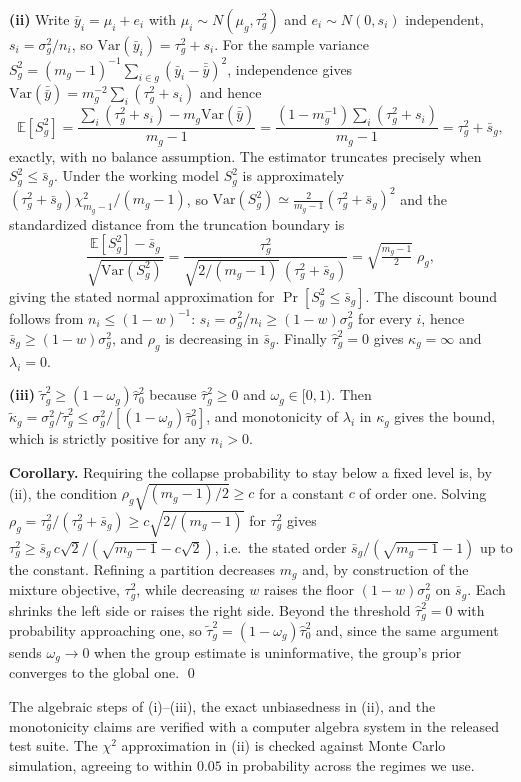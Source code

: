 \documentclass[twocolumn,10pt]{article}
\newcommand{\E}{\mathbb{E}}
\newcommand{\Var}{\mathrm{Var}}
\begin{document}
\textbf{(ii)} Write $\bar y_i=\mu_i+e_i$ with
$\mu_i\sim N(\mu_g,\tau_g^2)$ and $e_i\sim N(0,s_i)$ independent,
$s_i=\sigma_g^2/n_i$, so $\Var(\bar y_i)=\tau_g^2+s_i$. For the sample
variance $S_g^2=(m_g-1)^{-1}\sum_{i\in g}(\bar y_i-\bar{\bar y})^2$,
independence gives
$\Var(\bar{\bar y})=m_g^{-2}\sum_i(\tau_g^2+s_i)$ and hence
\[
\E[S_g^2]=\frac{\sum_i(\tau_g^2+s_i)-m_g\Var(\bar{\bar y})}{m_g-1}
=\frac{(1-m_g^{-1})\sum_i(\tau_g^2+s_i)}{m_g-1}
=\tau_g^2+\bar s_g ,
\]
exactly, with no balance assumption. The estimator truncates precisely
when $S_g^2\le\bar s_g$. Under the working model $S_g^2$ is
approximately $(\tau_g^2+\bar s_g)\chi^2_{m_g-1}/(m_g-1)$, so
$\Var(S_g^2)\simeq\frac{2}{m_g-1}(\tau_g^2+\bar s_g)^2$ and the
standardized distance from the truncation boundary is
\[
\frac{\E[S_g^2]-\bar s_g}{\sqrt{\Var(S_g^2)}}
=\frac{\tau_g^2}{\sqrt{2/(m_g-1)}\,(\tau_g^2+\bar s_g)}
=\sqrt{\tfrac{m_g-1}{2}}\;\rho_g ,
\]
giving the stated normal approximation for
$\Pr[S_g^2\le\bar s_g]$. The discount bound follows from
$n_i\le(1-w)^{-1}$: $s_i=\sigma_g^2/n_i\ge(1-w)\sigma_g^2$ for every
$i$, hence $\bar s_g\ge(1-w)\sigma_g^2$, and $\rho_g$ is decreasing in
$\bar s_g$. Finally $\hat\tau_g^2=0$ gives $\kappa_g=\infty$ and
$\lambda_i=0$.

\textbf{(iii)} $\tilde\tau_g^2\ge(1-\omega_g)\hat\tau_0^2$ because
$\hat\tau_g^2\ge0$ and $\omega_g\in[0,1)$. Then
$\tilde\kappa_g=\sigma_g^2/\tilde\tau_g^2\le
\sigma_g^2/[(1-\omega_g)\hat\tau_0^2]$, and monotonicity of
$\lambda_i$ in $\kappa_g$ gives the bound, which is strictly positive
for any $n_i>0$.

\textbf{Corollary.} Requiring the collapse probability to stay below a
fixed level is, by (ii), the condition $\rho_g\sqrt{(m_g-1)/2}\ge c$ for
a constant $c$ of order one. Solving
$\rho_g=\tau_g^2/(\tau_g^2+\bar s_g)\ge c\sqrt{2/(m_g-1)}$ for
$\tau_g^2$ gives
$\tau_g^2\ge\bar s_g\,c\sqrt{2}/(\sqrt{m_g-1}-c\sqrt2)$, i.e.\ the
stated order $\bar s_g/(\sqrt{m_g-1}-1)$ up to the constant. Refining a
partition decreases $m_g$ and, by construction of the mixture objective,
$\tau_g^2$, while decreasing $w$ raises the floor $(1-w)\sigma_g^2$ on
$\bar s_g$. Each shrinks the left side or raises the right side. Beyond
the threshold $\hat\tau_g^2=0$ with probability approaching one, so
$\tilde\tau_g^2=(1-\omega_g)\hat\tau_0^2$ and, since the same argument
sends $\omega_g\to0$ when the group estimate is uninformative, the
group's prior converges to the global one. \qed

The algebraic steps of (i)--(iii), the exact unbiasedness in (ii), and
the monotonicity claims are verified with a computer algebra system in
the released test suite. The $\chi^2$ approximation in (ii) is checked
against Monte Carlo simulation, agreeing to within $0.05$ in probability
across the regimes we use.
\end{document}
